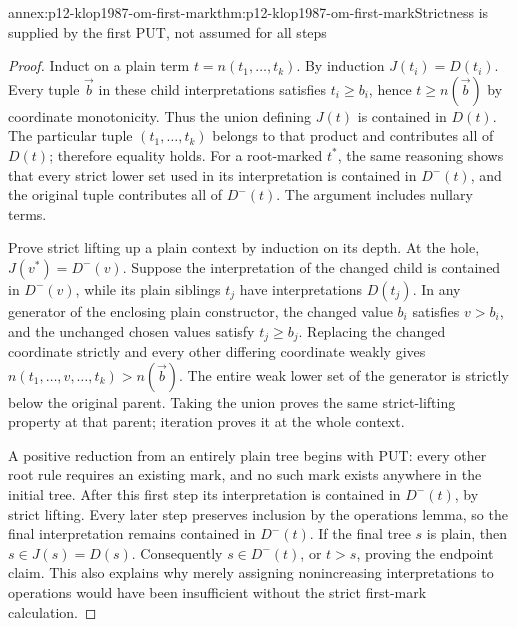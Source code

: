 \begin{annexitem}{annex:p12-klop1987-om-first-mark}{thm:p12-klop1987-om-first-mark}{Strictness is supplied by the first PUT, not assumed for all steps}
\begin{proof}
Induct on a plain term \(t=n(t_1,\ldots,t_k)\). By induction
\(J(t_i)=D(t_i)\). Every tuple \(\vec b\) in these child
interpretations satisfies \(t_i\geq b_i\), hence
\(t\geq n(\vec b)\) by coordinate monotonicity. Thus the
union defining \(J(t)\) is contained in \(D(t)\). The
particular tuple \((t_1,\ldots,t_k)\) belongs to that product
and contributes all of \(D(t)\); therefore equality holds.
For a root-marked \(t^*\), the same reasoning shows that every
strict lower set used in its interpretation is contained in
\(D^-(t)\), and the original tuple contributes all of
\(D^-(t)\). The argument includes nullary terms.

Prove strict lifting up a plain context by induction on its depth.
At the hole, \(J(v^*)=D^-(v)\). Suppose the interpretation of
the changed child is contained in \(D^-(v)\), while its plain
siblings \(t_j\) have interpretations \(D(t_j)\). In any
generator of the enclosing plain constructor, the changed value
\(b_i\) satisfies \(v>b_i\), and the unchanged chosen values
satisfy \(t_j\geq b_j\). Replacing the changed coordinate
strictly and every other differing coordinate weakly gives
\(n(t_1,\ldots,v,\ldots,t_k)>n(\vec b)\).
The entire weak lower set of the generator is strictly below the
original parent. Taking the union proves the same strict-lifting
property at that parent; iteration proves it at the whole context.

A positive reduction from an entirely plain tree begins with PUT:
every other root rule requires an existing mark, and no such mark
exists anywhere in the initial tree. After this first step its
interpretation is contained in \(D^-(t)\), by strict lifting.
Every later step preserves inclusion by the operations lemma, so
the final interpretation remains contained in \(D^-(t)\).
If the final tree \(s\) is plain, then \(s\in J(s)=D(s)\).
Consequently \(s\in D^-(t)\), or \(t>s\), proving the endpoint
claim. This also explains why merely assigning nonincreasing
interpretations to operations would have been insufficient without
the strict first-mark calculation.
\end{proof}
\end{annexitem}

